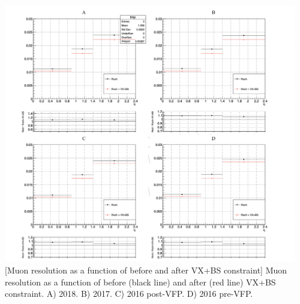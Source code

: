 \begin{multiFigure}
    \centering
        \includegraphics[width=0.96\textwidth]{figures/higgsmassmeas/vxbs/vxbs_muon_pTresol_vs_eta.png}
        [Muon \pT resolution as a function of \abseta before and after VX+BS constraint]
        {Muon \pT resolution as a function of \abseta before (black line) and after (red line) VX+BS constraint.
        \;A) 2018.
        \;B) 2017.
        \;C) 2016 post-VFP.
        \;D) 2016 pre-VFP.} %
\label{fig:Resolution_eta}
\end{multiFigure}

